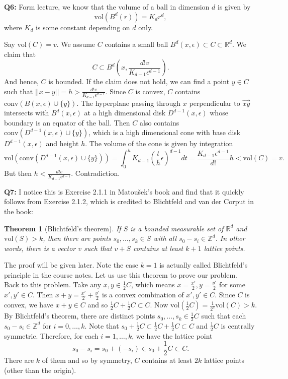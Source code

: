 \documentclass[12pt,reqno]{amsart}
\newtheorem{theorem}{Theorem}[section]
\theoremstyle{definition}
\newcommand{\ZZ}{\mathbb{Z}}
\newcommand{\RR}{\mathbb{R}}
\newcommand{\conv}[1]{\mathrm{conv}(#1)}
\newcommand{\vol}[1]{\mathrm{vol}(#1)}
\begin{document}
\noindent \textbf{Q6:}  Form lecture, we know that the volume of a ball in dimension $d$ is given by $$\vol{B^d(r)} =K_d r^d ,$$ where $K_d$ is some constant depending on $d$ only.

Say $\vol{C}=v$. We assume $C$ contains a small ball $B^d(x,\epsilon)\subset C\subset \RR^d$. We claim that $$C\subset B^d(x,  \frac{d! v}{K_{d-1}  \epsilon^{d-1}}).$$ And hence, $C$ is bounded. If the claim does not hold, we can find a point $y\in C$ such that $||x-y|| = h >  \frac{d! v}{K_{d-1}  \epsilon^{d-1}}$. Since $C$ is convex, $C$ contains $\conv{ B(x,\epsilon) \cup \{y\}}$. The hyperplane passing through $x$ perpendicular to $\overrightarrow{xy}$ intersects with $B^d(x,\epsilon)$ at a high dimensional disk $D^{d-1}(x,\epsilon)$ whose boundary is an equator of the ball. Then $C$ also contains $\conv{ D^{d-1}(x,\epsilon) \cup \{y\}}$, which is a high dimensional cone with base disk $D^{d-1}(x,\epsilon)$ and height $h$. The volume of the cone is given by integration $$\vol{  \conv{ D^{d-1}(x,\epsilon) \cup \{y\}}} = \int_{0}^h   K_{d-1} (\frac{t}{h} \epsilon)^{d-1} dt   = \frac{K_{d-1} \epsilon^{d-1}
  }{d!} h < \vol{C}=v.$$
But then $h < \frac{d! v}{K_{d-1}  \epsilon^{d-1}}$. Contradiction.

\newpage

\noindent \textbf{Q7:}
I notice this is Exercise 2.1.1 in Matou\v{s}ek's book and find that it quickly follows from Exercise 2.1.2, which is credited to Blichtfeld and van der Corput in the book:

\begin{theorem}[Blichtfeld's theorem]
  If $S$ is a bounded measurable set of $\RR^d$ and $\vol{S}>k$, then there are points $s_0,\dots,s_{k}\in S$ with all $s_0-s_i\in \ZZ^d$. In other words, there is a vector $v$ such that $v+S$ contains at least $k+1$ lattice points.
\end{theorem}
\noindent The proof will be given later. Note the case $k=1$ is actually called Blichtfeld's principle in the course notes. Let us use this theorem to prove our problem.\\



Back to this problem. Take any $x, y \in \frac{1}{2} C$, which means $x=\frac{x'}{2}, y=\frac{y'}{2}$ for some $x',y'\in C$. Then $x+y=\frac{x'}{2} +\frac{y'}{2}$ is a convex combination of $x',y'\in C$. Since $C$ is convex, we have $x+y\in C$ and so $\frac{1}{2}C+\frac{1}{2}C \subset C$. Now $\vol{\frac{1}{2} C} = \frac{1}{2^d} \vol{C} > k$. By Blichtfeld's theorem, there are distinct points $s_0,\dots,s_k \in \frac{1}{2}C$ such that each $s_0-s_i \in \ZZ^d$ for $i=0,\dots,k$. Note that $ s_0+\frac{1}{2} C \subset \frac{1}{2} C+\frac{1}{2} C\subset C$ and $\frac{1}{2} C$ is centrally symmetric. Therefore, for each $i=1,\dots,k$, we have the lattice point $$s_0-s_i = s_0+(-s_i)\in s_0+\frac{1}{2} C\subset C.$$ There are $k$ of them and so by symmetry, $C$ contains at least $2k$ lattice points (other than the origin).\\
\end{document}

